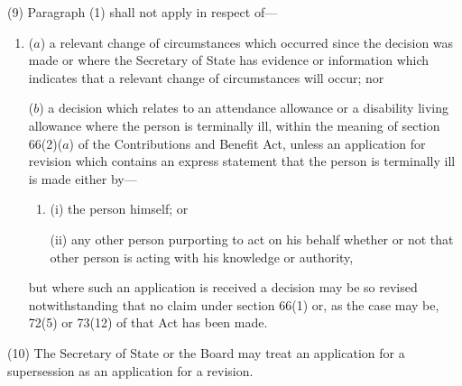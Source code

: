 \documentclass[12pt,a4paper]{article}
\begin{document}
(9) Paragraph (1) shall not apply in respect of—
\begin{enumerate}\item[]
($a$) a relevant change of circumstances which occurred since the decision was made or where the Secretary of State has evidence or information which indicates that a relevant change of circumstances will occur; nor

($b$) a decision which relates to an attendance allowance or a disability living allowance where the person is terminally ill, within the meaning of section 66(2)($a$) of the Contributions and Benefit Act, unless an application for revision which contains an express statement that the person is terminally ill is made either by—
\begin{enumerate}\item[]
(i) the person himself; or

(ii) any other person purporting to act on his behalf whether or not that other person is acting with his knowledge or authority,
\end{enumerate}
but where such an application is received a decision may be so revised notwithstanding that no claim under section 66(1) or, as the case may be, 72(5) or 73(12) of that Act has been made.
\end{enumerate}

(10) The Secretary of State 
or the Board  %
may treat an application for a supersession as an application for a revision.
\end{document}
